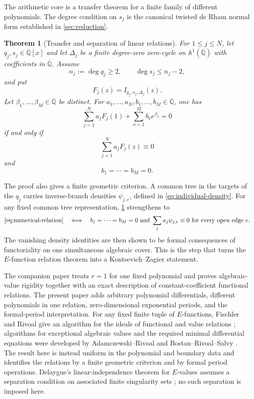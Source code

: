 \documentclass[11pt]{article}
\numberwithin{equation}{section}
\newtheorem{theorem}{Theorem}[section]
\theoremstyle{definition}
\theoremstyle{remark}
\newcommand{\Qbar}{\overline{\mathbb Q}}
\newcommand{\Aone}{\mathbb A^1}
\begin{document}
The arithmetic core is a transfer theorem for a finite family of different
polynomials.  The degree condition on $s_j$ is the canonical twisted de
Rham normal form established in \cref{sec:reduction}.

\begin{theorem}[Transfer and separation of linear relations]
\label{thm:transfer}
For $1\le j\le N$, let $q_j,s_j\in\Qbar[x]$ and let $\Delta_j$ be a finite
degree-zero zero-cycle on $\Aone(\Qbar)$ with coefficients in $\Qbar$.
Assume
\[
  n_j:=\deg q_j\ge2,
  \qquad \deg s_j\le n_j-2,
\]
and put
\[
  F_j(z)=I_{q_j,s_j,\Delta_j}(z).
\]
Let $\beta_1,\ldots,\beta_M\in\Qbar$ be distinct.  For
$a_1,\ldots,a_N,b_1,\ldots,b_M\in\Qbar$, one has
\begin{equation}\label{eq:numerical-relation}
  \sum_{j=1}^{N}a_jF_j(1)
  +\sum_{\nu=1}^{M}b_\nu e^{\beta_\nu}=0
\end{equation}
if and only if
\begin{equation}\label{eq:functional-relation}
  \sum_{j=1}^{N}a_jF_j(z)\equiv0
\end{equation}
and
\[
  b_1=\cdots=b_M=0.
\]
\end{theorem}

The proof also gives a finite geometric criterion.  A common tree in the
targets of the $q_j$ carries inverse-branch densities $\psi_{j,e}$, defined
in \eqref{eq:individual-density}.  For any fixed common tree representation,
\cref{thm:transfer} strengthens to
\begin{equation}\label{eq:geometric-summary}
  \eqref{eq:numerical-relation}
  \quad\Longleftrightarrow\quad
  b_1=\cdots=b_M=0
  \ \text{and}\ 
  \sum_j a_j\psi_{j,e}\equiv0
  \text{ for every open edge }e.
\end{equation}
The vanishing density identities are then shown to be formal consequences
of functoriality on one simultaneous algebraic cover.  This is the step that
turns the $E$-function relation theorem into a Kontsevich--Zagier statement.

The companion paper \cite{LongEIT} treats $r=1$ for one fixed polynomial and
proves algebraic-value rigidity together with an exact description of
constant-coefficient functional relations.  The present paper adds arbitrary
polynomial differentials, different polynomials in one relation,
zero-dimensional exponential periods, and the formal-period interpretation.  For any fixed finite tuple
of $E$-functions, Fischler and Rivoal give an algorithm for the ideals of
functional and value relations \cite{FischlerRivoalEffective}; algorithms
for exceptional algebraic values and the required minimal differential
equations were developed by Adamczewski--Rivoal and
Bostan--Rivoal--Salvy \cite{AdamczewskiRivoal,BostanRivoalSalvy}.  The result
here is instead uniform in the polynomial and boundary data and identifies
the relations by a finite geometric criterion and by formal period
operations.  Delaygue's linear-independence theorem for $E$-values assumes
a separation condition on associated finite singularity sets
\cite{Delaygue}; no such separation is imposed here.
\end{document}
